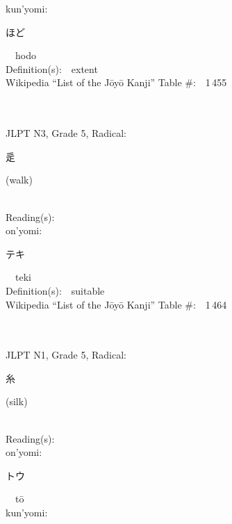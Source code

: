 \begin{multicols}{2}
{\hspace*{1em}}kun'yomi:\ \ \\
{\hspace*{2em}}{\begin{CJK}{UTF8}{min} ほど \end{CJK}}\ \ hodo\ \ \\
Definition(s):\ \ extent \\
Wikipedia ``List of the J\=oy\=o Kanji'' Table \#:\ \ 1\,455 \\
\ \ \\
{\fontsize{34pt}{40pt}  }\ \ \\  %
{JLPT N3, Grade 5, Radical:\ \ {\begin{CJK}{UTF8}{min} 辵 \end{CJK}} (walk) } \\
Reading(s):\ \ \\
{\hspace*{1em}}on'yomi:\ \ \\
{\hspace*{2em}}{\begin{CJK}{UTF8}{min} テキ \end{CJK}}\ \ teki\ \ \\
Definition(s):\ \ suitable \\
Wikipedia ``List of the J\=oy\=o Kanji'' Table \#:\ \ 1\,464 \\
\ \ \\
{\fontsize{34pt}{40pt}  }\ \ \\  %
{JLPT N1, Grade 5, Radical:\ \ {\begin{CJK}{UTF8}{min} 糸 \end{CJK}} (silk) } \\
Reading(s):\ \ \\
{\hspace*{1em}}on'yomi:\ \ \\
{\hspace*{2em}}{\begin{CJK}{UTF8}{min} トウ \end{CJK}}\ \ t\=o\ \ \\
{\hspace*{1em}}kun'yomi:\ \ \\

\end{multicols}
